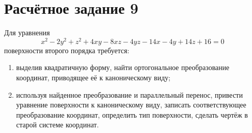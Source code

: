 \section{Расчётное задание 9}

Для уравнения
\begin{equation}
	\label{eq:num_09:main}
	x^2 - 2y^2 + z^2
	+ 4xy - 8xz - 4yz
	- 14x - 4y + 14z
	+ 16
	=
	0
\end{equation}
поверхности второго порядка требуется:
\begin{enumerate}[1)]
	\item выделив квадратичную форму, найти ортогональное преобразование координат, приводящее её к каноническому виду;
	\item используя найденное преобразование и параллельный перенос, привести уравнение поверхности к каноническому виду, записать соответствующее преобразование координат, определить тип поверхности, сделать чертёж в старой системе координат.
\end{enumerate}


